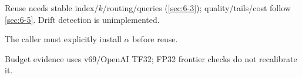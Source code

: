 Reuse needs stable index/$k$/routing/queries (\cref{sec:6-3}); quality/tails/cost follow \cref{sec:6-5}. Drift detection is unimplemented.

The caller must explicitly install $\alpha$ before reuse.

Budget evidence uses v69/OpenAI TF32; FP32 frontier checks do not recalibrate it.
